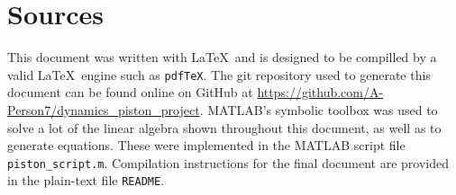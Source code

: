 \documentclass[nofoot,pdf-a,balance,colorlinks,upint,subscriptcorrection,varvw,mathalfa=cal=boondoxo]{asmeconf}
\begin{document}
    

    

    \section{Sources}\label{appendix:sources} 

    This document was written with \LaTeX\ and is designed to be compilled by a valid \LaTeX\ engine such as \texttt{pdfTeX}. The git repository used to generate this document can be found online on GitHub at \href{https://github.com/A-Person7/dynamics_piston_project}{https://github.com/A-Person7/dynamics_piston_project}. MATLAB's symbolic toolbox was used to solve a lot of the linear algebra shown throughout this document, as well as to generate equations. These were implemented in the MATLAB script file \texttt{piston_script.m}. Compilation instructions for the final document are provided in the plain-text file \texttt{README}.


    
\end{document}

